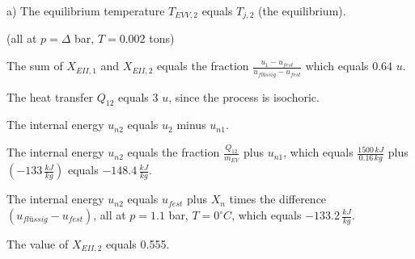 a) 
The equilibrium temperature \( T_{EVV,2} \) equals \( T_{j,2} \) (the equilibrium).

(all at \( p = \Delta \) bar, \( T = 0.002 \) tons)

The sum of \( X_{EII,1} \) and \( X_{EII,2} \) equals the fraction \(\frac{u_{1} - u_{fest}}{u_{flüssig} - u_{fest}}\) which equals 0.64 \( u \).

The heat transfer \( Q_{12} \) equals 3 \( u \), since the process is isochoric.

The internal energy \( u_{n2} \) equals \( u_{2} \) minus \( u_{n1} \).

The internal energy \( u_{n2} \) equals the fraction \(\frac{Q_{12}}{m_{EV}}\) plus \( u_{n1} \), which equals \(\frac{1500 \, kJ}{0.16 \, kg}\) plus \((-133 \, \frac{kJ}{kg})\) equals \(-148.4 \, \frac{kJ}{kg}\).

The internal energy \( u_{n2} \) equals \( u_{fest} \) plus \( X_{n} \) times the difference \((u_{flüssig} - u_{fest})\), all at \( p = 1.1 \) bar, \( T = 0^\circ C \), which equals \(-133.2 \, \frac{kJ}{kg}\).

The value of \( X_{EII,2} \) equals 0.555.